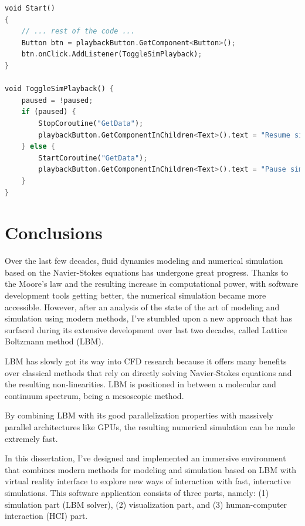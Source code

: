 \begin{lstlisting}[language=Rust, caption="Starting\, pausing and stopping the co-routines in Unity.", label=unity-start-stop-coroutine]
void Start()
{
	// ... rest of the code ...
	Button btn = playbackButton.GetComponent<Button>();
	btn.onClick.AddListener(ToggleSimPlayback);
}

void ToggleSimPlayback() {
	paused = !paused;
	if (paused) {
		StopCoroutine("GetData");
		playbackButton.GetComponentInChildren<Text>().text = "Resume simulation";
	} else {
		StartCoroutine("GetData");
		playbackButton.GetComponentInChildren<Text>().text = "Pause simulation";
	}
}
\end{lstlisting}



\section{Conclusions}\label{sec:conclusion}
Over the last few decades, fluid dynamics modeling and numerical simulation based on the Navier-Stokes equations has undergone great progress. Thanks to the Moore's law and the resulting increase in computational power, with software development tools getting better, the numerical simulation became more accessible. However, after an analysis of the state of the art of modeling and simulation using modern methods, I've stumbled upon a new approach that has surfaced during its extensive development over last two decades, called Lattice Boltzmann method (LBM).

LBM has slowly got its way into CFD research because it offers many benefits over classical methods that rely on directly solving Navier-Stokes equations and the resulting non-linearities. LBM is positioned in between a molecular and continuum spectrum, being a mesoscopic method.

By combining LBM with its good parallelization properties with massively parallel architectures like GPUs, the resulting numerical simulation can be made extremely fast.

In this dissertation, I've designed and implemented an immersive environment that combines modern methods for modeling and simulation based on LBM with virtual reality interface to explore new ways of interaction with fast, interactive simulations. This software application consists of three parts, namely: (1) simulation part (LBM solver), (2) visualization part, and (3) human-computer interaction (HCI) part. 

